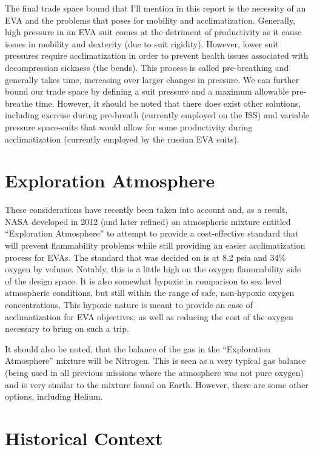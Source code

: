 \documentclass{article}
\begin{document}
  The final trade space bound that I'll mention in this report is the necessity of an EVA and the problems that poses for mobility and acclimatization. Generally, high pressure in an EVA suit comes at the detriment of productivity as it cause issues in mobility and dexterity (due to suit rigidity). However, lower suit pressures require acclimatization in order to prevent health issues associated with decompression sickness (the bends). This process is called pre-breathing and generally takes time, increasing over larger changes in pressure. We can further bound our trade space by defining a suit pressure and a maximum allowable pre-breathe time. However, it should be noted that there does exist other solutions, including exercise during pre-breath (currently employed on the ISS) and variable pressure space-suits that would allow for some productivity during acclimatization (currently employed by the russian EVA suits).
  
  \section{Exploration Atmosphere}

  These considerations have recently been taken into account and, as a result, NASA developed in 2012 (and later refined) an atmospheric mixture entitled ``Exploration Atmosphere'' to attempt to provide a cost-effective standard that will prevent flammability problems while still providing an easier acclimatization process for EVAs. The standard that was decided on is at 8.2 psia and 34\% oxygen by volume. Notably, this is a little high on the oxygen flammability side of the design space. It is also somewhat hypoxic in comparison to sea level atmospheric conditions, but still within the range of safe, non-hypoxic oxygen concentrations. This hypoxic nature is meant to provide an ease of acclimatization for EVA objectives, as well as reducing the cost of the oxygen necessary to bring on such a trip.

  It should also be noted, that the balance of the gas in the ``Exploration Atmosphere'' mixture will be Nitrogen. This is seen as a very typical gas balance (being used in all previous missions where the atmosphere was not pure oxygen) and is very similar to the mixture found on Earth. However, there are some other options, including Helium.

  \section{Historical Context}
\end{document}
